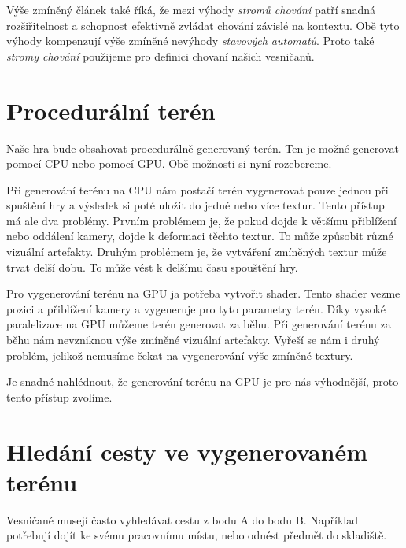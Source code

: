 Výše zmíněný článek také říká, že mezi výhody \textit{stromů chování} patří snadná rozšiřitelnost a schopnost efektivně zvládat chování závislé na kontextu. Obě tyto výhody kompenzují výše zmíněné nevýhody \textit{stavových automatů}. Proto také \textit{stromy chování} použijeme pro definici chovaní našich vesničanů.

\section{Procedurální terén}
\label{sec:terrain}
Naše hra bude obsahovat procedurálně generovaný terén. Ten je možné generovat pomocí CPU nebo pomocí GPU. Obě možnosti si nyní rozebereme.

Při generování terénu na CPU nám postačí terén vygenerovat pouze jednou při spuštění hry a výsledek si poté uložit do jedné nebo více textur. Tento přístup má ale dva problémy. Prvním problémem je, že pokud dojde k většímu přiblížení nebo oddálení kamery, dojde k deformaci těchto textur. To může způsobit různé vizuální artefakty. Druhým problémem je, že vytváření zmíněných textur může trvat delší dobu. To může vést k delšímu času spouštění hry.

Pro vygenerování terénu na GPU ja potřeba vytvořit shader. Tento shader vezme pozici a přiblížení kamery a vygeneruje pro tyto parametry terén. Díky vysoké paralelizace na GPU můžeme terén generovat za běhu. Při generování terénu za běhu nám nevzniknou výše zmíněné vizuální artefakty. Vyřeší se nám i druhý problém, jelikož nemusíme čekat na vygenerování výše zmíněné textury.

Je snadné nahlédnout, že generování terénu na GPU je pro nás výhodnější, proto tento přístup zvolíme.

\section{Hledání cesty ve vygenerovaném terénu}
\label{subsection:path-finding}
Vesničané musejí často vyhledávat cestu z bodu A do bodu B. Například potřebují dojít ke svému pracovnímu místu, nebo odnést předmět do skladiště.

